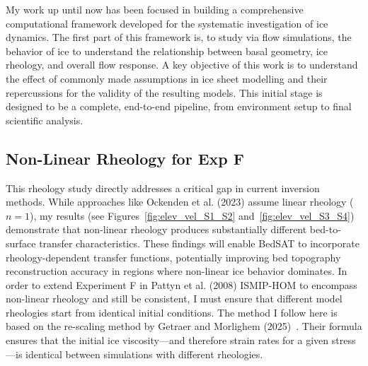 My work up until now has been focused in building a comprehensive computational framework developed for the systematic investigation of ice dynamics. The first part of this framework is, to study via flow simulations, the behavior of ice to understand the relationship between basal geometry, ice rheology, and overall flow response. A key objective of this work is to understand the effect of commonly made assumptions in ice sheet modelling and their repercussions for the validity of the resulting models. This initial stage is designed to be a complete, end-to-end pipeline, from environment setup to final scientific analysis. 

\subsection{Non-Linear Rheology for Exp F}
This rheology study directly addresses a critical gap in current inversion methods. While approaches like Ockenden et al. (2023) assume linear rheology ($n=1$), my results (see Figures~\ref{fig:elev_vel_S1_S2} and~\ref{fig:elev_vel_S3_S4}) demonstrate that non-linear rheology produces substantially different bed-to-surface transfer characteristics. These findings will enable BedSAT to incorporate rheology-dependent transfer functions, potentially improving bed topography reconstruction accuracy in regions where non-linear ice behavior dominates.
In order to extend Experiment F in Pattyn et al. (2008) ISMIP-HOM to encompass non-linear rheology and still be consistent, I must ensure that different model rheologies start from identical initial conditions. The method I follow here is based on the re-scaling method by Getraer and Morlighem (2025)~\cite{Getraer_2025}. Their formula ensures that the initial ice viscosity—and therefore strain rates for a given stress—is identical between simulations with different rheologies.

